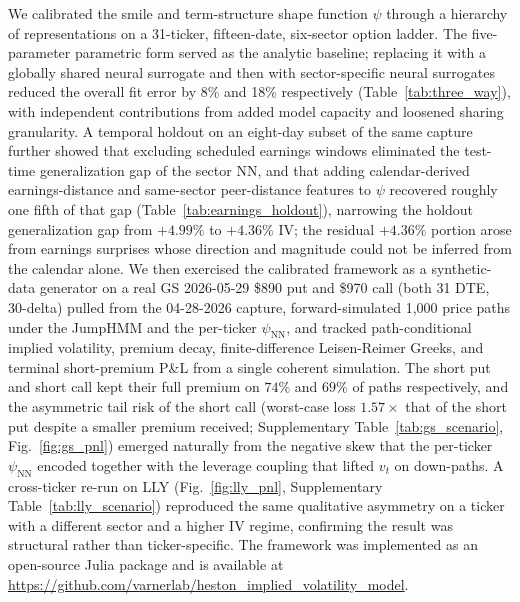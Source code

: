 We calibrated the smile and term-structure shape function $\psi$ through a hierarchy of representations on a 31-ticker, fifteen-date, six-sector option ladder. The five-parameter parametric form served as the analytic baseline; replacing it with a globally shared neural surrogate and then with sector-specific neural surrogates reduced the overall fit error by 8\% and 18\% respectively (Table~\ref{tab:three_way}), with independent contributions from added model capacity and loosened sharing granularity. A temporal holdout on an eight-day subset of the same capture further showed that excluding scheduled earnings windows eliminated the test-time generalization gap of the sector NN, and that adding calendar-derived earnings-distance and same-sector peer-distance features to $\psi$ recovered roughly one fifth of that gap (Table~\ref{tab:earnings_holdout}), narrowing the holdout generalization gap from $+4.99\%$ to $+4.36\%$ IV; the residual $+4.36\%$ portion arose from earnings surprises whose direction and magnitude could not be inferred from the calendar alone. We then exercised the calibrated framework as a synthetic-data generator on a real GS 2026-05-29 \$890 put and \$970 call (both 31 DTE, 30-delta) pulled from the 04-28-2026 capture, forward-simulated 1{,}000 price paths under the JumpHMM and the per-ticker $\psi_{\mathrm{NN}}$, and tracked path-conditional implied volatility, premium decay, finite-difference Leisen-Reimer Greeks, and terminal short-premium P\&L from a single coherent simulation. The short put and short call kept their full premium on $74\%$ and $69\%$ of paths respectively, and the asymmetric tail risk of the short call (worst-case loss $1.57\times$ that of the short put despite a smaller premium received; Supplementary Table~\ref{tab:gs_scenario}, Fig.~\ref{fig:gs_pnl}) emerged naturally from the negative skew that the per-ticker $\psi_{\mathrm{NN}}$ encoded together with the leverage coupling that lifted $v_t$ on down-paths. A cross-ticker re-run on LLY (Fig.~\ref{fig:lly_pnl}, Supplementary Table~\ref{tab:lly_scenario}) reproduced the same qualitative asymmetry on a ticker with a different sector and a higher IV regime, confirming the result was structural rather than ticker-specific. The framework was implemented as an open-source Julia package and is available at \url{https://github.com/varnerlab/heston_implied_volatility_model}.
